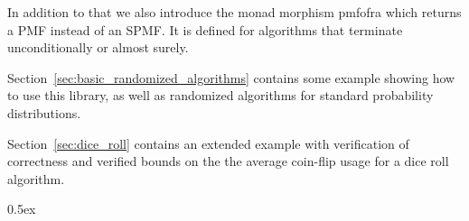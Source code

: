 \documentclass[11pt,a4paper]{article}
\begin{document}
In addition to that we also introduce the monad morphism 
{pmf{\isacharunderscore}of{\isacharunderscore}ra} which returns a PMF instead of an SPMF. It is
defined for algorithms that terminate unconditionally or almost surely.

Section~\ref{sec:basic_randomized_algorithms} contains some example showing how to use this library,
as well as randomized algorithms for standard probability distributions.

Section~\ref{sec:dice_roll} contains an extended example with verification of correctness and 
verified bounds on the the average coin-flip usage for a dice roll algorithm.

\parindent 0pt\parskip 0.5ex





\end{document}
